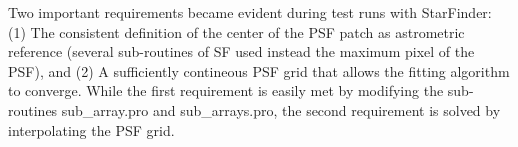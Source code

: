 Two important requirements became evident during test runs with StarFinder: (1) The consistent definition of the center of the PSF patch as astrometric reference (several sub-routines of SF used instead the maximum pixel of the PSF), and (2) A sufficiently contineous PSF grid that allows the fitting algorithm to converge. While the first requirement is easily met by modifying the sub-routines sub\_array.pro and sub\_arrays.pro, the second requirement is solved by interpolating the PSF grid. 
  
  
  
  
  